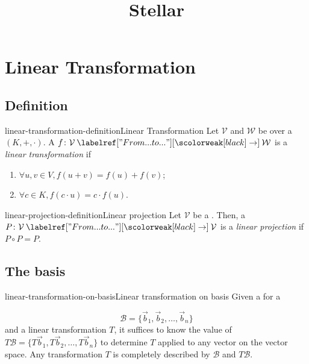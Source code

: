 \documentclass[preview]{standalone}
\begin{document}
\title{Stellar}
\genpage

\section{Linear Transformation}

\subsection{Definition}

\begin{snippetdefinition}{linear-transformation-definition}{Linear Transformation}
    Let \(\mathcal{V}\) and \(\mathcal{W}\) be  over a \field \((K, +, \cdot)\).
    A \function \(f \colon \mathcal{V} \fromto \mathcal{W}\) is a
    \emph{linear transformation} if
    \begin{enumerate}
        \item \(\forall u,v \in V, f(u + v) = f(u) + f(v)\);
        \item \(\forall c\in K, f(c\cdot u) = c\cdot f(u)\).
    \end{enumerate}
\end{snippetdefinition}

\begin{snippetdefinition}{linear-projection-definition}{Linear projection}
    Let \(\mathcal{V}\) be a \vectorspace. Then,
    a \lineartransformation \(P \colon \mathcal{V} \fromto \mathcal{V}\) is a
    \emph{linear projection} if \(P \circ P = P\).
\end{snippetdefinition}

\subsection{The basis}


\begin{snippettheorem}{linear-transformation-on-basis}{Linear transformation on basis}
    Given a \basis for a \vectorspace

    \[
        \mathcal{B}=\{\vec{b}_1, \vec{b}_2, \ldots, \vec{b}_n\}
    \]
    and a linear transformation \(T\), it suffices
    to know the value of \(T\mathcal{B}=\{T\vec{b}_1, T\vec{b}_2, \ldots, T\vec{b}_n\}\)
    to determine \(T\) applied to any vector on the vector space.
    Any transformation \(T\) is completely described by \(\mathcal{B}\)
    and \(T\mathcal{B}\).
\end{snippettheorem}
\end{document}

